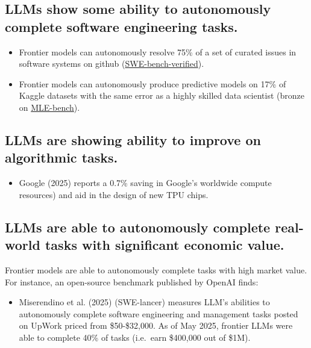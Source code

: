 \documentclass[
  letterpaper,
  DIV=11,
  numbers=noendperiod,
  oneside]{scrartcl}
\providecommand{\tightlist}{%
  \setlength{\itemsep}{0pt}\setlength{\parskip}{0pt}}
\begin{document}
\subsection{LLMs show some ability to autonomously complete software
engineering
tasks.}\label{llms-show-some-ability-to-autonomously-complete-software-engineering-tasks.}

\begin{itemize}
\item
  Frontier models can autonomously resolve 75\% of a set of curated
  issues in software systems on github
  (\href{https://openai.com/index/introducing-swe-bench-verified/}{SWE-bench-verified}).
\item
  Frontier models can autonomously produce predictive models on 17\% of
  Kaggle datasets with the same error as a highly skilled data scientist
  (bronze on \href{https://openai.com/index/mle-bench/}{MLE-bench}).
\end{itemize}

\subsection{LLMs are showing ability to improve on algorithmic
tasks.}\label{llms-are-showing-ability-to-improve-on-algorithmic-tasks.}

\begin{itemize}
\tightlist
\item
  Google (2025) reports a 0.7\% saving in Google's worldwide compute
  resources) and aid in the design of new TPU chips.
\end{itemize}

\subsection{LLMs are able to autonomously complete real-world tasks with
significant economic
value.}\label{llms-are-able-to-autonomously-complete-real-world-tasks-with-significant-economic-value.}

Frontier models are able to autonomously complete tasks with high market
value. For instance, an open-source benchmark published by OpenAI finds:

\begin{itemize}
\tightlist
\item
  Miserendino et al. (2025) (SWE-lancer) measures LLM's abilities to
  autonomously complete software engineering and management tasks posted
  on UpWork priced from \$50-\$32,000. As of May 2025, frontier LLMs
  were able to complete 40\% of tasks (i.e.~earn \$400,000 out of \$1M).
\end{itemize}
\end{document}
